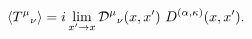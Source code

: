 \begin{equation}
\left<T^\mu{}_\nu\right> = i \lim_{x'\rightarrow x}
{\cal D}^\mu{}_\nu(x,x')\
D^{(\alpha,\kappa)}(x,x').
\label{prescription}
\end{equation}

